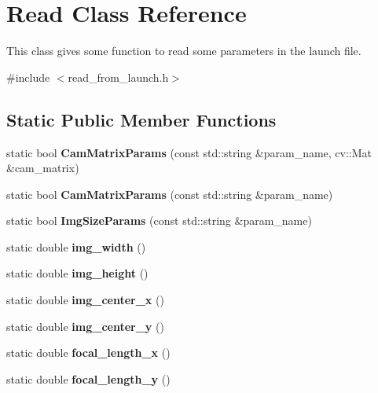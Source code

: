 \hypertarget{classRead}{}\section{Read Class Reference}
\label{classRead}


This class gives some function to read some parameters in the launch file.  




{\ttfamily \#include $<$read\+\_\+from\+\_\+launch.\+h$>$}

\subsection*{Static Public Member Functions}
\begin{DoxyCompactItemize}
\item 
\mbox{\label{classRead_a0fc95a66d94b6da93ac0b60911b08398}} 
static bool {\bfseries Cam\+Matrix\+Params} (const std\+::string \&param\+\_\+name, cv\+::\+Mat \&cam\+\_\+matrix)
\item 
\mbox{\label{classRead_abc66359993efe365d4f947bc6238f86b}} 
static bool {\bfseries Cam\+Matrix\+Params} (const std\+::string \&param\+\_\+name)
\item 
\mbox{\label{classRead_aab73bbff31d784b61f8666045eca6901}} 
static bool {\bfseries Img\+Size\+Params} (const std\+::string \&param\+\_\+name)
\item 
\mbox{\label{classRead_a859110cadfe874be22aa07b413e2b207}} 
static double {\bfseries img\+\_\+width} ()
\item 
\mbox{\label{classRead_a399d6d5bbe4eac87ea5f7991bf7870e6}} 
static double {\bfseries img\+\_\+height} ()
\item 
\mbox{\label{classRead_ae5317474320f3bd4a92fe59e249c86cd}} 
static double {\bfseries img\+\_\+center\+\_\+x} ()
\item 
\mbox{\label{classRead_a01dcb2b3c2b0eea4b786c17babed58d9}} 
static double {\bfseries img\+\_\+center\+\_\+y} ()
\item 
\mbox{\label{classRead_ab0084ecd91aa0279d5b246c486c792cb}} 
static double {\bfseries focal\+\_\+length\+\_\+x} ()
\item 
\mbox{\label{classRead_a858974a36b876d178f1d53d101724cc3}} 
static double {\bfseries focal\+\_\+length\+\_\+y} ()
\end{DoxyCompactItemize}
